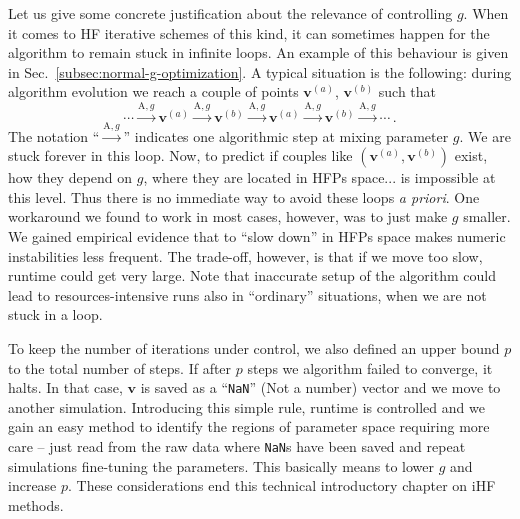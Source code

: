 Let us give some concrete justification about the relevance of controlling $g$. When it comes to HF iterative schemes of this kind, it can sometimes happen for the algorithm to remain stuck in infinite loops. An example of this behaviour is given in Sec.~\ref{subsec:normal-g-optimization}. A typical situation is the following: during algorithm evolution we reach a couple of points $\mathbf{v}^{(a)}$, $\mathbf{v}^{(b)}$ such that
\[
	\cdots \stackrel{\mathrm{A},g}{\longrightarrow} \mathbf{v}^{(a)} \stackrel{\mathrm{A},g}{\longrightarrow} \mathbf{v}^{(b)} \stackrel{\mathrm{A},g}{\longrightarrow} \mathbf{v}^{(a)} \stackrel{\mathrm{A},g}{\longrightarrow} \mathbf{v}^{(b)} \stackrel{\mathrm{A},g}{\longrightarrow} \cdots \, .
\]
The notation ``$\stackrel{\mathrm{A},g}{\longrightarrow}$'' indicates one algorithmic step at mixing parameter $g$. We are stuck forever in this loop. Now, to predict if couples like $(\mathbf{v}^{(a)},\mathbf{v}^{(b)})$ exist, how they depend on $g$, where they are located in HFPs space... is impossible at this level. Thus there is no immediate way to avoid these loops \textit{a priori}. One workaround we found to work in most cases, however, was to just make $g$ smaller. We gained empirical evidence that to ``slow down'' in HFPs space makes numeric instabilities less frequent. The trade-off, however, is that if we move too slow, runtime could get very large. Note that inaccurate setup of the algorithm could lead to resources-intensive runs also in ``ordinary'' situations, when we are not stuck in a loop.

To keep the number of iterations under control, we also defined an upper bound $p$ to the total number of steps. If after $p$ steps we algorithm failed to converge, it halts. In that case, $\mathbf{v}$ is saved as a ``\texttt{NaN}'' (Not a number) vector and we move to another simulation. Introducing this simple rule, runtime is controlled and we gain an easy method to identify the regions of parameter space requiring more care -- just read from the raw data where \texttt{NaN}s have been saved and repeat simulations fine-tuning the parameters. This basically means to lower $g$ and increase $p$. These considerations end this technical introductory chapter on iHF methods.
